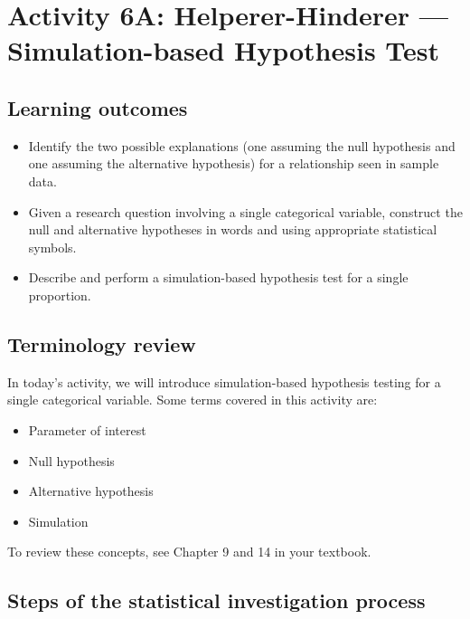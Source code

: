 \documentclass[
]{report}
\begin{document}
\newpage

\hypertarget{activity-6a-helperer-hinderer-simulation-based-hypothesis-test}{%
\section{Activity 6A: Helperer-Hinderer --- Simulation-based Hypothesis Test}\label{activity-6a-helperer-hinderer-simulation-based-hypothesis-test}}


\hypertarget{learning-outcomes-9}{%
\subsection{Learning outcomes}\label{learning-outcomes-9}}

\begin{itemize}
\item
  Identify the two possible explanations (one assuming the null hypothesis and one assuming the alternative hypothesis) for a relationship seen in sample data.
\item
  Given a research question involving a single categorical variable, construct the null and alternative hypotheses
  in words and using appropriate statistical symbols.
\item
  Describe and perform a simulation-based hypothesis test for a single proportion.
\end{itemize}

\hypertarget{terminology-review-8}{%
\subsection{Terminology review}\label{terminology-review-8}}

In today's activity, we will introduce simulation-based hypothesis testing for a single categorical variable. Some terms covered in this activity are:

\begin{itemize}
\item
  Parameter of interest
\item
  Null hypothesis
\item
  Alternative hypothesis
\item
  Simulation
\end{itemize}

To review these concepts, see Chapter 9 and 14 in your textbook.

\hypertarget{steps-of-the-statistical-investigation-process-1}{%
\subsection{Steps of the statistical investigation process}\label{steps-of-the-statistical-investigation-process-1}}
\end{document}
